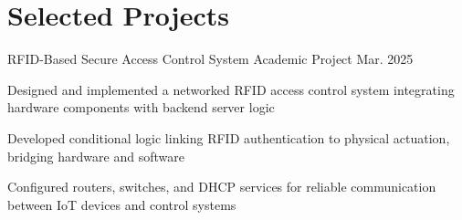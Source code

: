 \section{Selected Projects}
\setlength{\footskip}{12pt}
\itemizeBegin
  \item \projectSubheading
    {RFID-Based Secure Access Control System}
    {Academic Project}
    {Mar. 2025}
  \itemizeBegin
    \item Designed and implemented a networked RFID access control system integrating hardware components with backend server logic
    \item Developed conditional logic linking RFID authentication to physical actuation, bridging hardware and software
    \item Configured routers, switches, and DHCP services for reliable communication between IoT devices and control systems
    
